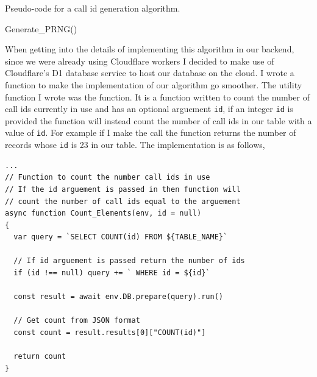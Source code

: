 \begin{algorithm}[H]
\caption{Pseudo-code for a call id generation algorithm.}
\sffamily

\begin{algorithmic}[1]

    \State{}

      Generate\_PRNG()
    \EndIf

    \State{}


  \EndFunction
\end{algorithmic}
\end{algorithm}

\mdseries

When getting into the details of implementing this algorithm
in our backend, since we were already using Cloudflare workers
I decided to make use of Cloudflare's D1 database service to
host our database on the cloud. I wrote a function
to make the implementation of our algorithm go smoother. The
utility function I wrote was the  function.
It is a function written to count the number of call ids
currently in use and has an optional arguement \texttt{id}, if
an integer \texttt{id} is provided the function will instead
count the number of call ids in our table with a value of
\texttt{id}. For example if I make the call
 the function returns the number of
records whose \texttt{id} is 23 in our table. The implementation
is as follows,

\begin{verbatim}
...
// Function to count the number call ids in use
// If the id arguement is passed in then function will
// count the number of call ids equal to the arguement
async function Count_Elements(env, id = null)
{
  var query = `SELECT COUNT(id) FROM ${TABLE_NAME}`

  // If id arguement is passed return the number of ids
  if (id !== null) query += ` WHERE id = ${id}`

  const result = await env.DB.prepare(query).run()

  // Get count from JSON format
  const count = result.results[0]["COUNT(id)"]

  return count
}
\end{verbatim}

{\color{gray} \hrulefill} \\ \vspace{0.2cm}

